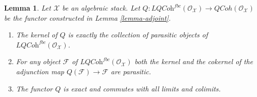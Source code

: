 \documentclass{stacks-project}
\theoremstyle{plain}
\newtheorem{lemma}[subsection]{Lemma}
\theoremstyle{definition}
\theoremstyle{remark}
\numberwithin{equation}{subsection}
\def\QCoh{\mathit{QCoh}}
\begin{document}
\begin{lemma}
\label{lemma-adjoint-kernel-parasitic}
Let $\mathcal{X}$ be an algebraic stack.
Let $Q : \textit{LQCoh}^{fbc}(\mathcal{O}_\mathcal{X}) \to
\QCoh(\mathcal{O}_\mathcal{X})$
be the functor constructed in Lemma \ref{lemma-adjoint}.
\begin{enumerate}
\item The kernel of $Q$ is exactly the collection of parasitic objects
of $\textit{LQCoh}^{fbc}(\mathcal{O}_\mathcal{X})$.
\item For any object $\mathcal{F}$
of $\textit{LQCoh}^{fbc}(\mathcal{O}_\mathcal{X})$ both the kernel and the
cokernel of the
adjunction map $Q(\mathcal{F}) \to \mathcal{F}$ are parasitic.
\item The functor $Q$ is exact and commutes with all limits and colimits.
\end{enumerate}
\end{lemma}
\end{document}
